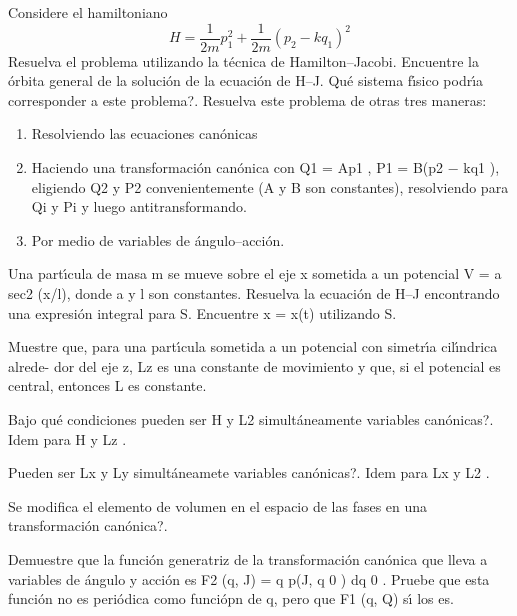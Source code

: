 \documentclass[10pt,oneside]{CBFT_book}
\begin{document}
\begin{ejercicios}
\label{ej29}
\item{ \bf }
Considere el hamiltoniano
\[
	H = \frac{1}{2m} p_1^2 + \frac{1}{2m} (p_2 - k q_1)^2
\]
Resuelva el problema utilizando la técnica de Hamilton–Jacobi. Encuentre la órbita
general de la solución de la ecuación de H–J. Qué sistema fı́sico podrı́a corresponder a
este problema?. Resuelva este problema de otras tres maneras:
\begin{enumerate}[label=(\alph*)]
\item Resolviendo las ecuaciones canónicas
\item Haciendo una transformación canónica con Q1 = Ap1 , P1 = B(p2 − kq1 ),
eligiendo Q2 y P2 convenientemente (A y B son constantes), resolviendo para
Qi y Pi y luego antitransformando.
\item Por medio de variables de ángulo–acción.
\end{enumerate}

\label{ej30}
\item{ \bf }
Una partı́cula de masa m se mueve sobre el eje x sometida a un potencial V =
a sec2 (x/l), donde a y l son constantes. Resuelva la ecuación de H–J encontrando
una expresión integral para S. Encuentre x = x(t) utilizando S.

\label{ej31}
\item{ \bf }
Muestre que, para una partı́cula sometida a un potencial con simetrı́a cilı́ndrica alrede-
dor del eje z, Lz es una constante de movimiento y que, si el potencial es central,
entonces L es constante.

\label{ej32}
\item{ \bf }
Bajo qué condiciones pueden ser H y L2 simultáneamente variables canónicas?. Idem
para H y Lz .

\label{ej33}
\item{ \bf }
Pueden ser Lx y Ly simultáneamete variables canónicas?. Idem para Lx y L2 .

\label{ej34}
\item{ \bf }
Se modifica el elemento de volumen en el espacio de las fases en una transformación
canónica?.

\label{ej35}
\item{ \bf }
Demuestre que la función generatriz de la transformación canónica que lleva a variables
de ángulo y acción es F2 (q, J) = q p(J, q 0 ) dq 0 . Pruebe que esta función no es periódica
como funciópn de q, pero que F1 (q, Q) sı́ los es.


\end{ejercicios}
\end{document}

